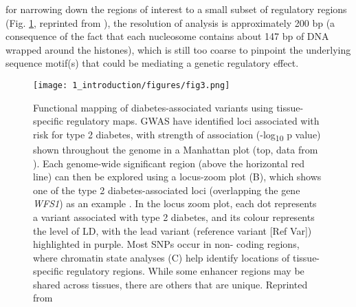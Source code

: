 for narrowing down the regions of interest to a small subset of regulatory regions (Fig. \ref{fig:ci_f3}, reprinted from \cite{kyonoGenomicAnnotationDiseaseassociated2019}), the resolution of analysis is approximately 200 bp (a consequence of the fact that each nucleosome contains about 147 bp of DNA wrapped around the histones), which is still too coarse to pinpoint the underlying sequence motif(s) that could be mediating a genetic regulatory effect. 


\begin{figure}
        \centering
        \texttt{[image: 1\_introduction/figures/fig3.png]}
        \caption[Functional mapping of diabetes-associated variants using tissue-specific regulatory maps]{Functional mapping of diabetes-associated variants using tissue-specific regulatory maps. GWAS have identified loci associated with risk for type 2 diabetes, with strength of association (-log\textsubscript{10} p value) shown throughout the genome in a Manhattan plot (top, data from \cite{thediabetesgeneticsreplicationandmeta-analysisdiagramconsortiumLargescaleAssociationAnalysis2012,t2dknowledgeportalTypeDiabetesKnowledge2019}). Each genome-wide significant region (above the horizontal red line) can then be explored using a locus-zoom plot (B), which shows one of the type 2 diabetes-associated loci (overlapping the gene \textit{WFS1}) as an example \cite{t2dknowledgeportalTypeDiabetesKnowledge2019}. In the locus zoom plot, each dot represents a variant associated with type 2 diabetes, and its colour represents the level of LD, with the lead variant (reference variant [Ref Var]) highlighted in purple. Most SNPs occur in non- coding regions, where chromatin state analyses (C) help identify locations of tissue-specific regulatory regions. While some enhancer regions may be shared across tissues, there are others that are unique. Reprinted from \cite{kyonoGenomicAnnotationDiseaseassociated2019}}
        \label{fig:ci_f3}
\end{figure}


